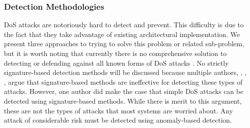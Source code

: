 \documentclass{acm_proc_article-sp}
\begin{document}
		\subsubsection{Detection Methodologies} 
		DoS attacks are notoriously hard to detect and prevent. This difficulty is due to the fact that they take advantage of existing architectural implementation. We present three approaches to trying to solve this problem or related sub-problem, but it is worth noting that currently there is no comprehensive solution to detecting or defending against all known forms of DoS attacks \cite{Specht2004}. No strictly signature-based detection methods will be discussed because multiple authors, \cite{T.2009}, \cite{R.2004}, \cite{G.2006}, argue that signature-based methods are ineffective for detecting these types of attacks. However, one author \cite{Alenezi2012} did make the case that simple DoS attacks can be detected using signature-based methods. While there is merit to this argument, these are not the types of attacks that most systems are worried about. Any attack of considerable risk must be detected using anomaly-based detection.
\end{document}
